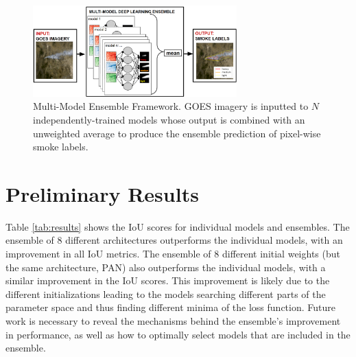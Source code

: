 \documentclass{article}
\begin{document}
\begin{figure}
    \centering
    \includegraphics[width=0.7\textwidth]{ensemble_framework.png}
    \caption{\RaggedRight Multi-Model Ensemble Framework. GOES imagery is inputted to $N$ independently-trained models whose output is combined with an unweighted average to produce the ensemble prediction of pixel-wise smoke labels.}
    \label{fig:ensemble_framework}
\end{figure}
\section{Preliminary Results}
Table \ref{tab:results} shows the IoU scores for individual models and ensembles. The ensemble of 8 different architectures outperforms the individual models, with an improvement in all IoU metrics. The ensemble of 8 different initial weights (but the same architecture, PAN) also outperforms the individual models, with a similar improvement in the IoU scores. This improvement is likely due to the different initializations leading to the models searching different parts of the parameter space and thus finding different minima of the loss function. Future work is necessary to reveal the mechanisms behind the ensemble's improvement in performance, as well as how to optimally select models that are included in the ensemble.
\end{document}
